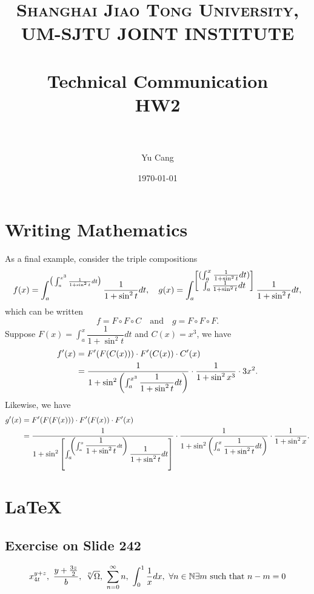 \documentclass[paper=a4, fontsize=11pt]{scrartcl} %
\title{	
\normalfont \normalsize 
\textsc{Shanghai Jiao Tong University, UM-SJTU JOINT INSTITUTE} \\ [25pt] %
\horrule{0.5pt} \\[0.4cm] %
\huge Technical Communication\\ HW2 \\ %
\horrule{2pt} \\[0.5cm] %
}
\author{Yu Cang \quad 018370210001} %
\date{\normalsize \today} %
\numberwithin{equation}{section} %
\numberwithin{figure}{section} %
\numberwithin{table}{section} %
\begin{document}
\maketitle %

\section{Writing Mathematics}
	As a final example, consider the triple compositions
	\begin{eqnarray}
		f(x)=\int_a^{\big(\int_a^{x^3} {\frac{1}{1+\sin^2{t}}} dt \big)} \frac{1}{1+\sin^2{t}} dt,
		\quad
		 g(x)=\int_a^{\left[\begin{matrix}(\int_a^x \frac{1}{1+\sin^2{t}} dt)\\\int_a \frac{1}{1+\sin^2{t}} dt\end{matrix}\right]} \frac{1}{1+\sin^2{t}} dt,\notag
	\end{eqnarray}
	which can be written
	\[
		f=F\circ F\circ C \quad \mbox{and}\quad g=F\circ F\circ F.
	\]
	Suppose $F(x)=\int_a^x \dfrac{1}{1+\sin^2{t}} dt$ and $C(x)=x^3$, we have
	\begin{align}
		f'(x) & = F'(F(C(x)))\cdot F'(C(x))\cdot C'(x) \notag\\
		       & = \dfrac{1}{1+\sin^2{\left( \int_a^{x^3} \dfrac{1}{1+\sin^2{t}} dt \right)}} \cdot \dfrac{1}{1+\sin^2{x^3}} \cdot 3x^2.\notag
	\end{align}
	Likewise, we have
	\begin{align}
		g'(x) & = F'(F(F(x)))\cdot F'(F(x))\cdot F'(x) \notag\\
			   & = \dfrac{1}{1+\sin^2{\left[ \int_a^{ \left( \int_a^x \dfrac{1}{1+\sin^2{t}} dt \right) } \dfrac{1}{1+\sin^2{t}} dt \right]}} \cdot \dfrac{1}{1+\sin^2{\left( \int_a^{x} \dfrac{1}{1+\sin^2{t}} dt \right)}} \cdot \dfrac{1}{1+\sin^2{x}}.\notag
	\end{align}

\section{\LaTeX}
	\subsection{Exercise on Slide 242}
		\begin{eqnarray}\notag
			x^{y+z}_{4t},\ \frac{y+\frac{3z}{2}}{b},\ \sqrt[n]{\Omega},\ \sum\limits_{n=0}^{\infty}n,\  \int_{0}^{1}\frac{1}{x} dx,\ \forall n \in \mathbb{N} \exists m\ \mbox{such that}\ n-m=0
		\end{eqnarray}
\end{document}
